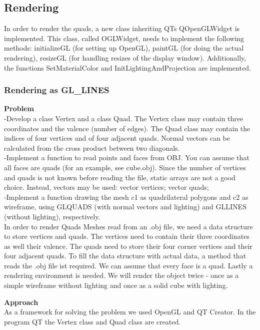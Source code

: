 \documentclass[12pt,a4paper]{scrartcl}
\begin{document}
\subsection{Rendering}
In order to render the quads, a new class inheriting QTs QOpenGLWidget is implemented. This class, called OGLWidget, needs to implement the following methods: initializeGL (for setting up OpenGL), paintGL (for doing the actual rendering), resizeGL (for handling resizes of the display window). Additionally, the functions SetMaterialColor and InitLightingAndProjection are implemented.

\subsubsection{Rendering as GL_LINES}

\large
\textbf{Problem} \\
-Develop a class Vertex and a class Quad. The Vertex class may contain three coordinates and the
valence (number of edges). The Quad class may contain the indices of four vertices and of four
adjacent quads. Normal vectors can be calculated from the cross product between two diagonals.\\
-Implement a function to read points and faces from OBJ. You can assume that all faces are quads (for an example, see cube.obj). Since the number of vertices and quads is not known before reading the file, static arrays are not a good choice. Instead, vectors may be used: vector vertices; vector quads;\\
-Implement a function drawing the mesh c1 as quadrilateral polygons and c2 as wireframe, using GLQUADS (with normal vectors and lighting) and GLLINES (without lighting), respectively.\\[0,5cm]

In order to render Quads Meshes read from an .obj file, we need a data structure to store vertices and quads. The vertices need to contain their three coordinates as well their valence. The quads need to store their four corner vertices and their four adjacent quads.
To fill the data structure with actual data, a method that reads the .obj file ist required. We can assume that every face is a quad.
Lastly a rendering environment is needed. We will render the object twice - once as a simple wireframe without lighting and once as a solid cube with lighting.


\textbf{Approach}\\
As a framework for solving the problem we used OpenGL and QT Creator. In the program QT the Vertex class and Quad class are created.\\
\end{document}
